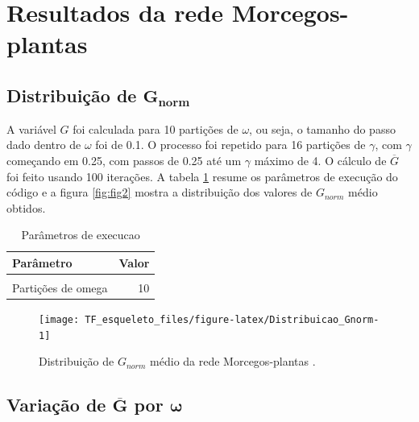 \documentclass[
  12pt,
]{article}
\begin{document}
\hypertarget{resultados-da-rede-morcegos-plantas}{%
\section{Resultados da rede
Morcegos-plantas}\label{resultados-da-rede-morcegos-plantas}}

\hypertarget{distribuiuxe7uxe3o-de-mathbfg_norm}{%
\subsection{\texorpdfstring{Distribuição de
\(\mathbf{G_{norm}}\)}{Distribuição de \textbackslash mathbf\{G\_\{norm\}\}}}\label{distribuiuxe7uxe3o-de-mathbfg_norm}}

A variável \(G\) foi calculada para 10 partições de \(\omega\), ou seja,
o tamanho do passo dado dentro de \(\omega\) foi de 0.1. O processo foi
repetido para 16 partições de \(\gamma\), com \(\gamma\) começando em
0.25, com passos de 0.25 até um \(\gamma\) máximo de 4. O cálculo de
\(\overline{G}\) foi feito usando 100 iterações. A tabela \ref{tab:2}
resume os parâmetros de execução do código e a figura \ref{fig:fig2}
mostra a distribuição dos valores de \(G_{norm}\) médio obtidos.

\begin{table}[!h]

\caption{\label{tab:Parametros_Execucao}\label{tab:2}Parâmetros de execucao}
\centering
\begin{tabular}[t]{lr}
\toprule
Parâmetro & Valor\\
\midrule
\cellcolor{gray!6}{Iterações} & \cellcolor{gray!6}{100}\\
Partições de omega & 10\\
\bottomrule
\end{tabular}
\end{table}

\begin{figure}[H]

{\centering \texttt{[image: TF\_esqueleto\_files/figure-latex/Distribuicao\_Gnorm-1]} 

}

\caption{\label{fig:fig2}Distribuição de $G_{norm}$ médio da rede  Morcegos-plantas .}\label{fig:Distribuicao_Gnorm}
\end{figure}

\hypertarget{variauxe7uxe3o-de-mathbfoverlineg-por-boldsymbolomega}{%
\subsection{\texorpdfstring{Variação de \(\mathbf{\overline{G}}\) por
\(\boldsymbol{\omega}\)}{Variação de \textbackslash mathbf\{\textbackslash overline\{G\}\} por \textbackslash boldsymbol\{\textbackslash omega\}}}\label{variauxe7uxe3o-de-mathbfoverlineg-por-boldsymbolomega}}
\end{document}
